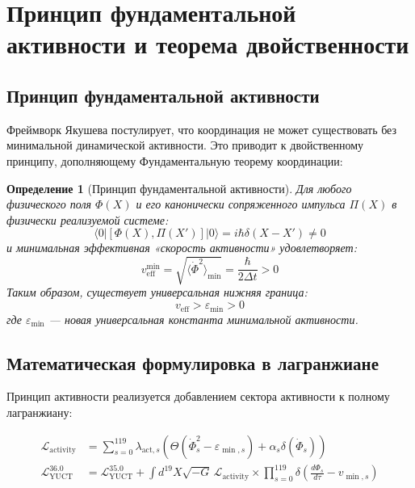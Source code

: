\documentclass[11pt,a4paper]{article}
\newtheorem{definition}{Определение}
\begin{document}
	
	\section{Принцип фундаментальной активности и теорема двойственности}
	\label{sec:activity_principle}
	
	\subsection{Принцип фундаментальной активности}
	
	Фреймворк Якушева постулирует, что координация не может существовать без минимальной динамической активности. Это приводит к двойственному принципу, дополняющему Фундаментальную теорему координации:
	
	\begin{definition}[Принцип фундаментальной активности]
		Для любого физического поля $\Phi(X)$ и его канонически сопряженного импульса $\Pi(X)$ в физически реализуемой системе:
		\[
		\langle 0 | [\Phi(X), \Pi(X')] | 0 \rangle = i\hbar\delta(X-X') \neq 0
		\]
		и минимальная эффективная «скорость активности» удовлетворяет:
		\[
		v_{\mathrm{eff}}^{\min} = \sqrt{\langle \dot{\Phi}^2 \rangle_{\min}} = \frac{\hbar}{2\Delta t} > 0
		\]
		Таким образом, существует универсальная нижняя граница:
		\[
		\boxed{v_{\mathrm{eff}} > \varepsilon_{\min} > 0}
		\]
		где $\varepsilon_{\min}$ — новая универсальная константа минимальной активности.
	\end{definition}
	
	\subsection{Математическая формулировка в лагранжиане}
	
	Принцип активности реализуется добавлением сектора активности к полному лагранжиану:
	
	\begin{align}
		\mathcal{L}_{\mathrm{activity}} &= \sum_{s=0}^{119} \lambda_{\mathrm{act},s} \left( \Theta(\dot{\Phi}_s^2 - \varepsilon_{\min,s}) + \alpha_s \delta(\dot{\Phi}_s) \right) \\
		\mathcal{L}_{\mathrm{YUCT}}^{36.0} &= \mathcal{L}_{\mathrm{YUCT}}^{35.0} + \int d^{19}X \sqrt{-G} \, \mathcal{L}_{\mathrm{activity}} \times \prod_{s=0}^{119} \delta\left( \frac{d\Phi_s}{d\tau} - v_{\min,s} \right)
	\end{align}
	
\end{document}
